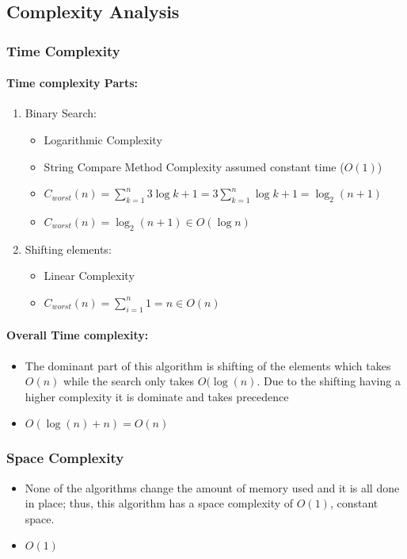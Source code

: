 \documentclass{article}
\begin{document}
\subsection{Complexity Analysis}

\subsubsection{Time Complexity}

\paragraph{Time complexity Parts:}

\begin{enumerate}
    \item Binary Search: 
    \begin{itemize}
     \item Logarithmic Complexity 
     \item String Compare Method Complexity assumed constant time (\(O(1)\))
    \item \( C_{worst}(n) = \sum_{k=1}^{n} 3 \log k + 1 = 3 \sum_{k=1}^{n} \log k + 1  = \log_2 (n+1) \)
    \item \(C_{worst}(n) = \log_2 (n+1)  \in O(\log n) \)
    \end{itemize}
    \item Shifting elements:
    \begin{itemize}
   		\item Linear Complexity
    		\item \( C_{worst}(n) = \sum_{i=1}^{n} 1 = n \in O(n) \)
    \end{itemize}
\end{enumerate}


\paragraph{Overall Time complexity:}
\begin{itemize}
	\item The dominant part of this algorithm is shifting of the elements which takes \(O(n)\) while the search only takes \(O(\log(n)\). Due to the shifting having a higher complexity it is dominate and takes precedence 
    \item \(O(\log(n) + n) = O(n)\)	
\end{itemize}

\subsubsection{Space Complexity}
\begin{itemize}
\item None of the algorithms change the amount of memory used and it is all done in place; thus, this algorithm has a space complexity of  \(O(1)\), constant space.
\item \(O(1)\)
\end{itemize}
\end{document}
